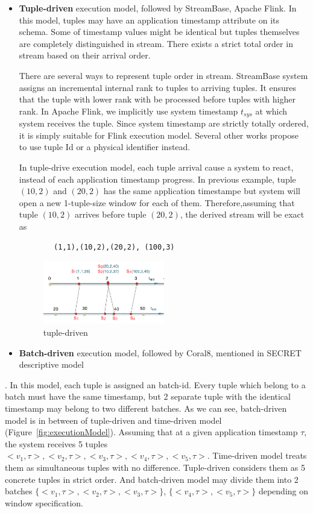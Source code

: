 \begin{itemize}
	\item \textbf{Tuple-driven} execution model, followed by StreamBase, Apache Flink. In this model, tuples may have an application timestamp attribute on its schema. Some of timestamp values might be identical but tuples themselves are completely distinguished in stream. There exists a strict total order in stream based on their arrival order. 
	
	There are several ways to represent tuple order in stream. StreamBase system assigns an incremental internal rank to tuples to arriving tuples. It ensures that the tuple with lower rank with be processed before tuples with higher rank. In Apache Flink, we implicitly use system timestamp   $t_{sys}$ at which system receives the tuple. Since system timestamp are strictly totally ordered, it is simply suitable for Flink execution model. Several other works propose to use tuple Id \citep{Dindar:2013} or a physical identifier\citep{Petit:2010} instead. 
	
	In tuple-drive execution model, each tuple arrival cause a system to react, instead of each application timestamp progress. In previous example, tuple $(10,2)$ and $(20,2)$ has the same application timestampe but system will open a new 1-tuple-size window for each of them. Therefore,assuming that tuple $(10,2)$ arrives before tuple $(20,2)$, the derived stream will be exact as 
	\begin{verbatim}
		(1,1),(10,2),(20,2), (100,3)
	\end{verbatim}
	
	\begin{figure}[htbp!] 
\centering    
\includegraphics[width=0.5\textwidth]{tuple-driven}
\caption{tuple-driven}
\label{fig:tuple-driven}
\end{figure}
	
	\item \textbf{Batch-driven} execution model, followed by Coral8, mentioned in SECRET\citep{Botan:2010} descriptive model
\end{itemize}. In this model, each tuple is assigned an batch-id. Every tuple which belong to a batch must have the same timestamp, but 2 separate tuple with the identical timestamp may belong to two different batches. As we can see, batch-driven model is in between of tuple-driven and time-driven model (Figure~\ref{fig:executionModel}). Assuming that at a given application timestamp $\tau$, the system receives 5 tuples ${<v_1,\tau>,<v_2,\tau>,<v_3,\tau>,<v_4,\tau>,<v_5,\tau>}$. Time-driven model treats them as simultaneous tuples with no difference. Tuple-driven considers them as 5 concrete tuples in strict order. And batch-driven model may divide them into 2 batches $\{<v_1,\tau>,<v_2,\tau>,<v_3,\tau>\}$, $\{<v_4,\tau>,<v_5,\tau>\}$ depending on window specification.


